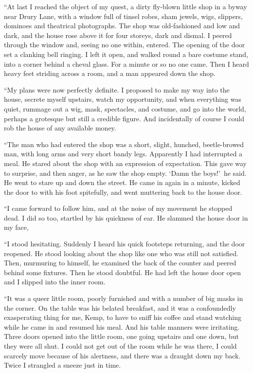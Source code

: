 “At last I reached the object of my quest, a dirty fly-blown little shop in a byway near Drury Lane, with a window full of tinsel robes, sham jewels, wigs, slippers, dominoes and theatrical photographs. The shop was old-fashioned and low and dark, and the house rose above it for four storeys, dark and dismal. I peered through the window and, seeing no one within, entered. The opening of the door set a clanking bell ringing. I left it open, and walked round a bare costume stand, into a corner behind a cheval glass. For a minute or so no one came. Then I heard heavy feet striding across a room, and a man appeared down the shop.

“My plans were now perfectly definite. I proposed to make my way into the house, secrete myself upstairs, watch my opportunity, and when everything was quiet, rummage out a wig, mask, spectacles, and costume, and go into the world, perhaps a grotesque but still a credible figure. And incidentally of course I could rob the house of any available money.

“The man who had entered the shop was a short, slight, hunched, beetle-browed man, with long arms and very short bandy legs. Apparently I had interrupted a meal. He stared about the shop with an expression of expectation. This gave way to surprise, and then anger, as he saw the shop empty. ‘Damn the boys!’\ he said. He went to stare up and down the street. He came in again in a minute, kicked the door to with his foot spitefully, and went muttering back to the house door.

“I came forward to follow him, and at the noise of my movement he stopped dead. I did so too, startled by his quickness of ear. He slammed the house door in my face,

“I stood hesitating. Suddenly I heard his quick footsteps returning, and the door reopened. He stood looking about the shop like one who was still not satisfied. Then, murmuring to himself, he examined the back of the counter and peered behind some fixtures. Then he stood doubtful. He had left the house door open and I slipped into the inner room.

{“It was a queer little room, poorly furnished and with a number of big masks in the corner. On the table was his belated breakfast, and it was a confoundedly exasperating thing for me, Kemp, to have to sniff his coffee and stand watching while he came in and resumed his meal. And his table manners were irritating. Three doors opened into the little room, one going upstairs and one down, but they were all shut. I could not get out of the room while he was there, I could scarcely move because of his alertness, and there was a draught down my back. Twice I strangled a sneeze just in time.}

